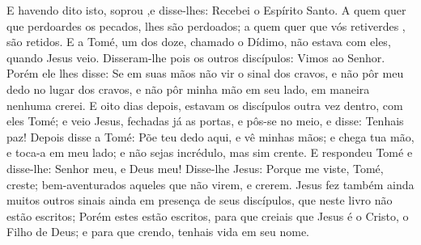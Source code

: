 {E havendo dito isto, soprou
{} ,e disse-lhes: Recebei o Espírito Santo.
A quem quer que perdoardes os pecados, lhes são perdoados;
{} a quem quer que vós retiverdes
{} ,{} são retidos.
E a Tomé, um dos doze, chamado o Dídimo, não estava com eles, quando Jesus veio.
Disseram-lhe pois os outros discípulos: Vimos ao Senhor. Porém ele lhes disse: Se em suas mãos não vir o sinal dos cravos, e não pôr meu dedo no lugar dos cravos, e não pôr minha mão em seu lado, em maneira nenhuma crerei.
E oito dias depois, estavam os discípulos outra vez dentro,
{} com eles Tomé; e veio Jesus, fechadas já as portas, e pôs-se no meio, e disse: Tenhais paz!
Depois disse a Tomé: Põe teu dedo aqui, e vê minhas mãos; e chega tua mão, e toca-a em meu lado; e não sejas incrédulo, mas sim crente.
E respondeu Tomé e disse-lhe: Senhor meu, e Deus meu!
Disse-lhe Jesus: Porque me viste, Tomé, creste; bem-aventurados aqueles que não virem, e crerem.
Jesus fez também ainda muitos outros sinais ainda em presença de seus discípulos, que neste livro não estão escritos;
Porém estes estão escritos, para que creiais que Jesus é o Cristo, o Filho de Deus; e para que crendo, tenhais vida em seu nome.

}
